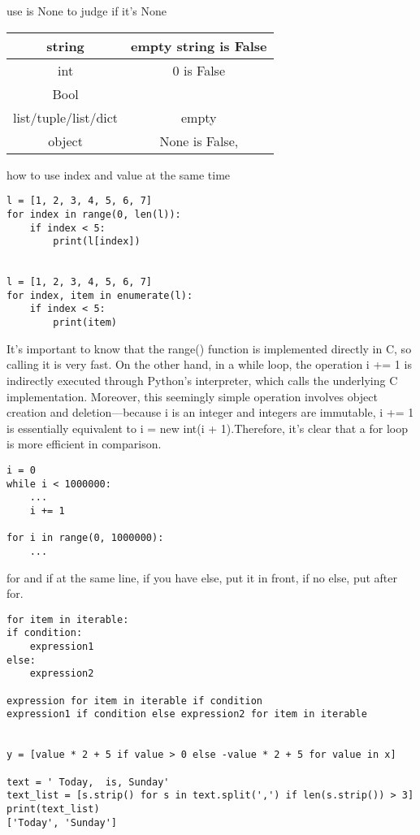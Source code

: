 \documentclass[a4paper,12pt,twoside]{book}
\begin{document}
use is None to judge if it's None

\begin{tabular}{|c|c|}
	\hline
string 	&  empty string is False\\
	\hline
int	& 0 is False  \\
	\hline
Bool	&  \\
	\hline
list/tuple/list/dict	& empty \\
	\hline
object	&  None is False, \\
	\hline
	
\end{tabular}


how to use index and value at the same time
\begin{lstlisting}
l = [1, 2, 3, 4, 5, 6, 7]
for index in range(0, len(l)):
	if index < 5:
		print(l[index])        


l = [1, 2, 3, 4, 5, 6, 7]
for index, item in enumerate(l):
	if index < 5:
		print(item)  
\end{lstlisting}
It’s important to know that the range() function is implemented directly in C, so calling it is very fast. On the other hand, in a while loop, the operation i += 1 is indirectly executed through Python’s interpreter, which calls the underlying C implementation. Moreover, this seemingly simple operation involves object creation and deletion—because i is an integer and integers are immutable, i += 1 is essentially equivalent to i = new int(i + 1).Therefore, it's clear that a for loop is more efficient in comparison.	


\begin{lstlisting}
i = 0
while i < 1000000: 
	...
	i += 1
	
for i in range(0, 1000000):
	...
\end{lstlisting}

for and if at the same line, if you have else, put it in front, if no else, put after for.

\begin{lstlisting}
for item in iterable:
if condition:
	expression1
else:
	expression2	
	
expression for item in iterable if condition
expression1 if condition else expression2 for item in iterable

	
y = [value * 2 + 5 if value > 0 else -value * 2 + 5 for value in x]

text = ' Today,  is, Sunday'
text_list = [s.strip() for s in text.split(',') if len(s.strip()) > 3]
print(text_list)
['Today', 'Sunday']
\end{lstlisting}
\end{document}
